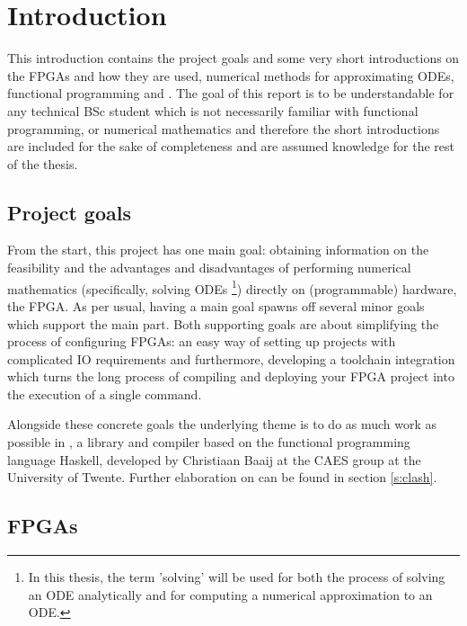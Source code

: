 \chapter{Introduction} 
This introduction contains the project goals and some very short introductions on the FPGAs and how they are used, numerical methods for approximating ODEs, functional programming and \clash{}. The goal of this report is to be understandable for any technical BSc student which is not necessarily familiar with functional programming, or numerical mathematics and therefore the short introductions are included for the sake of completeness and are assumed knowledge for the rest of the thesis. 

\section{Project goals}
From the start, this project has one main goal: obtaining information on the feasibility and the advantages and disadvantages of performing numerical mathematics (specifically, solving ODEs \footnote{In this thesis, the term 'solving' will be used for both the process of solving an ODE analytically and for computing a numerical approximation to an ODE.}) directly on (programmable) hardware, the FPGA. As per usual, having a main goal spawns off several minor goals which support the main part. Both supporting goals are about simplifying the process of configuring FPGAs: an easy way of setting up projects with complicated IO requirements and furthermore, developing a toolchain integration which turns the long process of compiling and deploying your FPGA project into the execution of a single command.

Alongside these concrete goals the underlying theme is to do as much work as possible in \clash{}, a library and compiler based on the functional programming language Haskell, developed by Christiaan Baaij at the CAES group at the University of Twente. Further elaboration on \clash{} can be found in section \ref{s:clash}.


\section{FPGAs}
